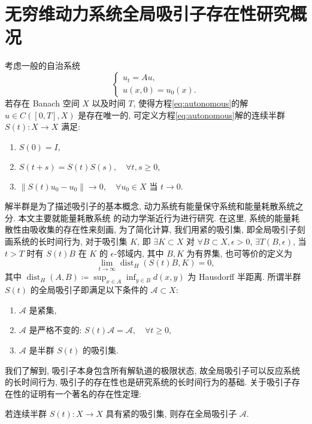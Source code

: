 \documentclass[oneside,longtitle]{LZUthesis}
\numberwithin{equation}{chapter}
\newcommand*\norm[1]{\lVert#1\rVert}
\DeclareMathOperator{\dist}{dist}
\begin{document}
\section{无穷维动力系统全局吸引子存在性研究概况}
考虑一般的自治系统
\begin{equation}\label{eq:autonomous}
	\begin{cases}
		u_t = Au,\\
		u(x, 0) = u_0(x).
	\end{cases}
\end{equation}
若存在 Banach 空间 $X$ 以及时间 $T$, 使得方程\eqref{eq:autonomous}的解 $u \in C([0, T], X)$ 是存在唯一的,
可定义方程\eqref{eq:autonomous}解的连续半群 $S(t) \colon X \to X$ 满足:
\begin{enumerate}[itemindent = -1em]
	\item $S(0) = I,$
	\item $S(t + s) = S(t)S(s), \quad \forall t, s \geq 0,$
	\item $\norm{S(t)u_0 - u_0} \to 0, \quad\forall u_0 \in X$ 当 $t \to 0$.
\end{enumerate}
解半群是为了描述吸引子的基本概念, 
动力系统有能量保守系统和能量耗散系统之分. 本文主要就能量耗散系统
的动力学渐近行为进行研究. 在这里, 系统的能量耗散性由吸收集的存在性来刻画,
为了简化计算, 我们用紧的吸引集, 即全局吸引子刻画系统的长时间行为, 对于吸引集 $K$,
即 $\exists K \subset X$
对 $\forall B \subset X, \epsilon > 0$, $\exists T(B, \epsilon)$,
当 $t > T$ 时有 $S(t)B$ 在 $K$ 的 $\epsilon$-邻域内,
其中 $B, K$ 为有界集, 也可等价的定义为
\begin{equation*}
	\lim_{t \to \infty} \dist_H(S(t)B, K) = 0,
\end{equation*}
其中 $\dist_H(A, B) \coloneqq \sup_{x \in A}\inf_{y \in B}d(x, y)$ 为 Hausdorff 半距离.
所谓半群 $S(t)$ 的全局吸引子即满足以下条件的 $\mathcal{A} \subset X$:
\begin{enumerate}[itemindent = -1em]
	\item $\mathcal{A}$ 是紧集,
	\item $\mathcal{A}$ 是严格不变的: $S(t)\mathcal{A} = \mathcal{A}, \quad\forall t \geq 0$,
	\item $\mathcal{A}$ 是半群 $S(t)$ 的吸引集.
\end{enumerate}
我们了解到, 吸引子本身包含所有解轨道的极限状态,
故全局吸引子可以反应系统的长时间行为, 吸引子的存在性也是研究系统的长时间行为的基础.
关于吸引子存在性的证明有一个著名的存在性定理:
\begin{theorem}\label{thm:attractorexist}
	若连续半群 $S(t): X \to X$ 具有紧的吸引集, 则存在全局吸引子 $\mathcal{A}$.
\end{theorem}
\end{document}
